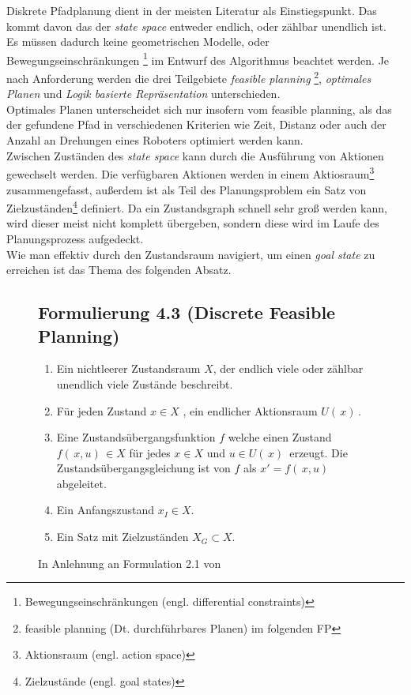 Diskrete Pfadplanung dient in der meisten Literatur als Einstiegspunkt. Das kommt davon das der \textit{state space} entweder endlich, oder zählbar unendlich ist.\\
Es müssen dadurch keine geometrischen Modelle, oder Bewegungseinschränkungen \footnote{Bewegungseinschränkungen (engl. differential constraints)} im Entwurf des Algorithmus beachtet werden.
Je nach Anforderung werden die drei Teilgebiete \textit{feasible planning} \footnote{feasible planning (Dt. durchführbares Planen) im folgenden FP}, \textit{optimales Planen} und \textit{Logik basierte Repräsentation} unterschieden.\cite[~S. 27]{Lav06}\\
Optimales Planen unterscheidet sich nur insofern vom feasible planning, als das der gefundene Pfad in verschiedenen Kriterien wie Zeit, Distanz oder auch der Anzahl an Drehungen eines Roboters optimiert werden kann.\cite[~S. 43]{Lav06} \\
Zwischen Zuständen des \textit{state space} kann durch die Ausführung von Aktionen gewechselt werden. Die verfügbaren Aktionen werden in einem Aktiosraum\footnote{Aktionsraum (engl. action space) } zusammengefasst, außerdem ist als Teil des Planungsproblem ein Satz von Zielzuständen\footnote{Zielzustände (engl. goal states)} definiert. 
Da ein Zustandsgraph schnell sehr groß werden kann, wird dieser meist nicht komplett übergeben, sondern diese wird im Laufe des Planungsprozess aufgedeckt.
\cite[~S. 43]{Lav06} \\
Wie man effektiv durch den Zustandsraum navigiert, um einen \textit{goal state} zu erreichen ist das Thema des folgenden Absatz.
\begin{figure}
\centering
\subsection*{Formulierung 4.3 (Discrete Feasible Planning)}
\begin{enumerate}
	\item Ein nichtleerer Zustandsraum $X$, der endlich viele oder zählbar unendlich viele Zustände beschreibt.  
	\item Für jeden Zustand $x \in X$ , ein endlicher Aktionsraum $U( \, x) \,$.
	\item Eine Zustandsübergangsfunktion $f$ welche einen Zustand  $f( \, x,u) \, \in X$ für jedes $x \in X$  und $u \in U( \, x) \,$ erzeugt. Die Zustandsübergangsgleichung ist von $f$ als $x' = f( \, x,u )\, $ abgeleitet.
	\item Ein Anfangszustand $ x_{I} \in X$.
	\item Ein Satz mit Zielzuständen $X_{G} \subset X$.
\end{enumerate}
\caption{In Anlehnung an Formulation 2.1 von \cite[~S. 29]{Lav06}}
\label{lav03}
\end{figure}
